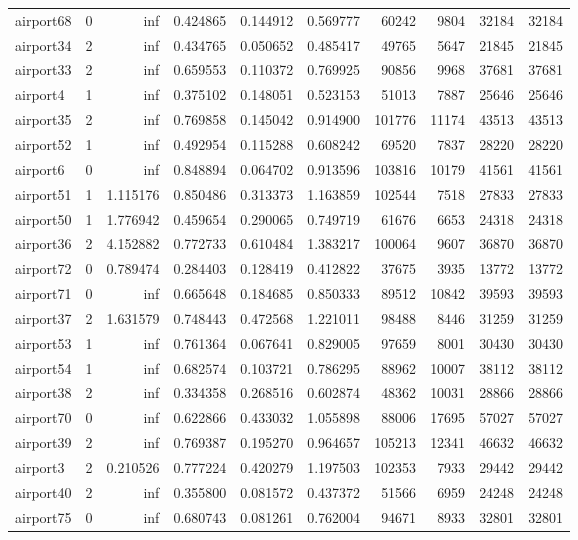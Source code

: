 \begin{longtable}{|l|r|r|r|r|r|r|r|r|r|}
airport68 & 0 & inf & 0.424865 & 0.144912 & 0.569777 & 60242 & 9804 & 32184 & 32184 \\
airport34 & 2 & inf & 0.434765 & 0.050652 & 0.485417 & 49765 & 5647 & 21845 & 21845 \\
airport33 & 2 & inf & 0.659553 & 0.110372 & 0.769925 & 90856 & 9968 & 37681 & 37681 \\
airport4 & 1 & inf & 0.375102 & 0.148051 & 0.523153 & 51013 & 7887 & 25646 & 25646 \\
airport35 & 2 & inf & 0.769858 & 0.145042 & 0.914900 & 101776 & 11174 & 43513 & 43513 \\
airport52 & 1 & inf & 0.492954 & 0.115288 & 0.608242 & 69520 & 7837 & 28220 & 28220 \\
airport6 & 0 & inf & 0.848894 & 0.064702 & 0.913596 & 103816 & 10179 & 41561 & 41561 \\
airport51 & 1 & 1.115176 & 0.850486 & 0.313373 & 1.163859 & 102544 & 7518 & 27833 & 27833 \\
airport50 & 1 & 1.776942 & 0.459654 & 0.290065 & 0.749719 & 61676 & 6653 & 24318 & 24318 \\
airport36 & 2 & 4.152882 & 0.772733 & 0.610484 & 1.383217 & 100064 & 9607 & 36870 & 36870 \\
airport72 & 0 & 0.789474 & 0.284403 & 0.128419 & 0.412822 & 37675 & 3935 & 13772 & 13772 \\
airport71 & 0 & inf & 0.665648 & 0.184685 & 0.850333 & 89512 & 10842 & 39593 & 39593 \\
airport37 & 2 & 1.631579 & 0.748443 & 0.472568 & 1.221011 & 98488 & 8446 & 31259 & 31259 \\
airport53 & 1 & inf & 0.761364 & 0.067641 & 0.829005 & 97659 & 8001 & 30430 & 30430 \\
airport54 & 1 & inf & 0.682574 & 0.103721 & 0.786295 & 88962 & 10007 & 38112 & 38112 \\
airport38 & 2 & inf & 0.334358 & 0.268516 & 0.602874 & 48362 & 10031 & 28866 & 28866 \\
airport70 & 0 & inf & 0.622866 & 0.433032 & 1.055898 & 88006 & 17695 & 57027 & 57027 \\
airport39 & 2 & inf & 0.769387 & 0.195270 & 0.964657 & 105213 & 12341 & 46632 & 46632 \\
airport3 & 2 & 0.210526 & 0.777224 & 0.420279 & 1.197503 & 102353 & 7933 & 29442 & 29442 \\
airport40 & 2 & inf & 0.355800 & 0.081572 & 0.437372 & 51566 & 6959 & 24248 & 24248 \\
airport75 & 0 & inf & 0.680743 & 0.081261 & 0.762004 & 94671 & 8933 & 32801 & 32801 \\

\end{longtable}
